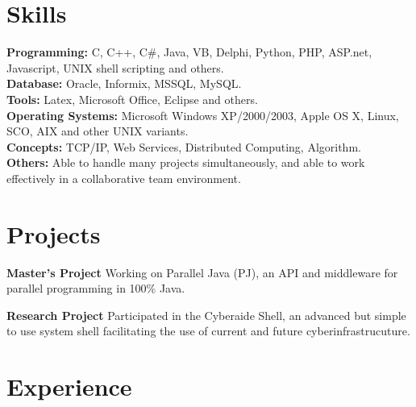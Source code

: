 \documentclass[margin]{res}
\begin{document}
\begin{resume}
\section{Skills}
{\bf Programming:} C, C++, C\#, Java, VB, Delphi, Python, PHP, ASP.net, Javascript, UNIX shell scripting and others. \\
{\bf Database:} Oracle, Informix, MSSQL, MySQL.\\
{\bf Tools:} Latex, Microsoft Office, Eclipse and others.\\
{\bf Operating Systems:} Microsoft Windows XP/2000/2003, Apple OS X, Linux, SCO, AIX and other UNIX variants.\\
{\bf Concepts:} TCP/IP, Web Services, Distributed Computing, Algorithm.\\
{\bf Others:} Able to handle many projects simultaneously, and able to work effectively in a collaborative team environment.\\

\section{Projects}
{\bf Master's Project}
Working on Parallel Java (PJ), an API and middleware for parallel programming in 100\% Java.

{\bf Research Project}
Participated in the Cyberaide Shell, an advanced but simple to use system shell facilitating the use of current and future cyberinfrastrucuture.

\section{Experience}


\end{resume}
\end{document}
